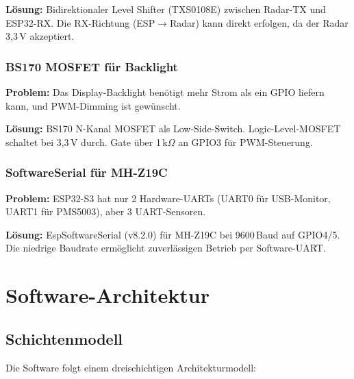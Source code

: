 \documentclass[a4paper,11pt]{article}
\begin{document}
\textbf{Lösung:} Bidirektionaler Level Shifter (TXS0108E) zwischen Radar-TX und ESP32-RX. Die RX-Richtung (ESP$\rightarrow$Radar) kann direkt erfolgen, da der Radar 3,3\,V akzeptiert.

\subsubsection{BS170 MOSFET für Backlight}
\textbf{Problem:} Das Display-Backlight benötigt mehr Strom als ein GPIO liefern kann, und PWM-Dimming ist gewünscht.

\textbf{Lösung:} BS170 N-Kanal MOSFET als Low-Side-Switch. Logic-Level-MOSFET schaltet bei 3,3\,V durch. Gate über 1\,k$\Omega$ an GPIO3 für PWM-Steuerung.

\subsubsection{SoftwareSerial für MH-Z19C}
\textbf{Problem:} ESP32-S3 hat nur 2 Hardware-UARTs (UART0 für USB-Monitor, UART1 für PMS5003), aber 3 UART-Sensoren.

\textbf{Lösung:} EspSoftwareSerial (v8.2.0) für MH-Z19C bei 9600\,Baud auf GPIO4/5. Die niedrige Baudrate ermöglicht zuverlässigen Betrieb per Software-UART.

\section{Software-Architektur}

\subsection{Schichtenmodell}
Die Software folgt einem dreischichtigen Architekturmodell:
\end{document}
